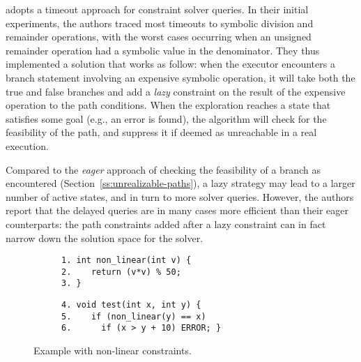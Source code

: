
\cite{UCKLEE-USEC15} adopts a timeout approach for constraint solver queries. In their initial experiments, the authors traced most timeouts to symbolic division and remainder operations, with the worst cases occurring when an unsigned remainder operation had a symbolic value in the denominator.
They thus implemented a solution that works as follow: when the executor encounters a branch statement involving an expensive symbolic operation, it will take both the true and false branches and add a {\em lazy} constraint on the result of the expensive operation to the path conditions. When the exploration reaches a state that satisfies some goal (e.g., an error is found), the algorithm will check for the feasibility of the path, and suppress it if deemed as unreachable in a real execution.

Compared to the {\em eager} approach of checking the feasibility of a branch as encountered (Section~\ref{ss:unrealizable-paths}), a lazy strategy may lead to a larger number of active states, and in turn to more solver queries. However, the authors report that the delayed queries are in many cases more efficient than their eager counterparts: the path constraints added after a lazy constraint can in fact narrow down the solution space for the solver.

\begin{figure}[t]
  \begin{center}
  \begin{subfigure}{.4\textwidth}
    \vspace{0mm}
    \begin{lstlisting}[basicstyle=\ttfamily\scriptsize]
1. int non_linear(int v) {
2.    return (v*v) % 50;
3. }
    \end{lstlisting}
  \end{subfigure}%
    \begin{subfigure}{.4\textwidth}
    \begin{lstlisting}[basicstyle=\ttfamily\scriptsize]
4. void test(int x, int y) {
5.    if (non_linear(y) == x) 
6.      if (x > y + 10) ERROR; }
    \end{lstlisting}
  \end{subfigure}%
  \end{center}
  \vspace{-4.0mm}
  \caption{Example with non-linear constraints.}
  \label{fi:non-linear-constraints}
\end{figure}


